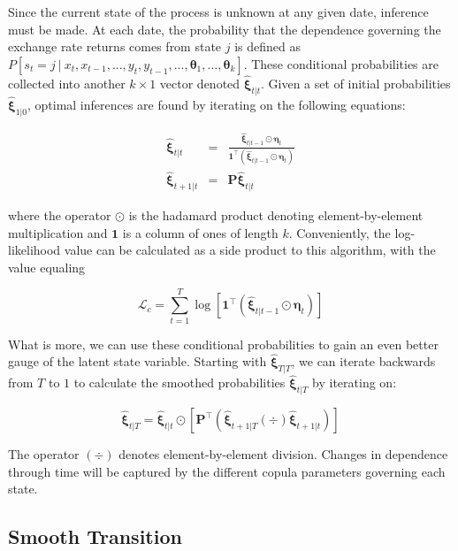 \documentclass[12pt]{article}
\newcommand{\Lagr}{\mathcal{L}}
\newcommand{\boldXi}{\hat{\boldsymbol{\xi}}}
\begin{document}
Since the current state of the process is unknown at any given date, inference must be made. At each date, the probability that the dependence governing the exchange rate returns comes from state $j$ is defined as $P\left[s_{t}=j~|~x_{t},x_{t-1},...,y_{t},y_{t-1},...,\mathbf{\theta}_{1},...,\mathbf{\theta}_{k}\right]$. These conditional probabilities are collected into another $k\times 1$ vector denoted $\boldXi_{t|t}$. Given a set of initial probabilities $\boldXi_{1|0}$, optimal inferences are found by iterating on the following equations:

\begin{eqnarray}
	\boldXi_{t|t} &=& \frac{\boldXi_{t|t-1}\odot\boldsymbol{\eta}_{t}}{\mathbf{1}^{\top}\left(\boldXi_{t|t-1}\odot \boldsymbol{\eta}_{t}\right)} \\
	\boldXi_{t+1|t} &=& \mathbf{P} \boldXi_{t|t}
\end{eqnarray}

where the operator $\odot$ is the hadamard product denoting element-by-element multiplication and $\mathbf{1}$ is a column of ones of length $k$. Conveniently, the log-likelihood value can be calculated as a side product to this algorithm, with the value equaling

\begin{equation}
\Lagr_{c} = \sum_{t=1}^{T}\log \left[\mathbf{1}^{\top}\left(\boldXi_{t|t-1} \odot \boldsymbol{\eta}_{t}\right)\right] 
\end{equation}

What is more, we can use these conditional probabilities to gain an even better gauge of the latent state variable. Starting with $\boldXi_{T|T}$, we can iterate backwards from $T$ to $1$ to calculate the smoothed probabilities $\boldXi_{t|T}$ by iterating on:

\begin{equation} \label{eqn:Kim_smooth_probability}
	\boldXi_{t|T} = \boldXi_{t|t} \odot \left[\mathbf{P}^{\top}\left(\boldXi_{t+1|T}\left(\div\right)\boldXi_{t+1|t}\right)\right]
\end{equation}

The operator $\left(\div\right)$ denotes element-by-element division. Changes in dependence through time will be captured by the different copula parameters governing each state.

\subsection{Smooth Transition}
\end{document}
